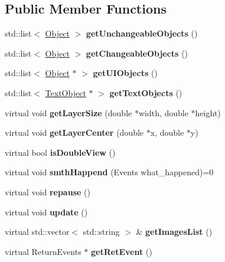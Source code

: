 \subsection*{Public Member Functions}
\begin{DoxyCompactItemize}
\item 
\mbox{\label{class_layer_a88251ea7cc836a16dbca1e134c5a5ee5}} 
std\+::list$<$ \hyperlink{class_object}{Object} $>$ {\bfseries get\+Unchangeable\+Objects} ()
\item 
\mbox{\label{class_layer_af1303bfbd28803f32708729f54ca13ec}} 
std\+::list$<$ \hyperlink{class_object}{Object} $>$ {\bfseries get\+Changeable\+Objects} ()
\item 
\mbox{\label{class_layer_a2aebff84a5f25f25d56d3886c8c3a4b1}} 
std\+::list$<$ \hyperlink{class_object}{Object} $\ast$ $>$ {\bfseries get\+U\+I\+Objects} ()
\item 
\mbox{\label{class_layer_abd1a2a8242a5d43b389e896a3d3de800}} 
std\+::list$<$ \hyperlink{class_text_object}{Text\+Object} $\ast$ $>$ {\bfseries get\+Text\+Objects} ()
\item 
\mbox{\label{class_layer_a62b75693308f561bd8454a32dab9e10f}} 
virtual void {\bfseries get\+Layer\+Size} (double $\ast$width, double $\ast$height)
\item 
\mbox{\label{class_layer_af2778374314bfe517007c0b0ac3fc896}} 
virtual void {\bfseries get\+Layer\+Center} (double $\ast$x, double $\ast$y)
\item 
\mbox{\label{class_layer_a952ad194d28fe6999b85bd3d9d28ee31}} 
virtual bool {\bfseries is\+Double\+View} ()
\item 
\mbox{\label{class_layer_a41318993a0f6c7ba3bc6d964f7802c10}} 
virtual void {\bfseries smth\+Happend} (Events what\+\_\+happened)=0
\item 
\mbox{\label{class_layer_a9e197da9a85a455af77c83301ebb4d1d}} 
virtual void {\bfseries repause} ()
\item 
\mbox{\label{class_layer_a4243d1a4b059eb7433cbfe7cdfc2c191}} 
virtual void {\bfseries update} ()
\item 
\mbox{\label{class_layer_a9acbfda611b85762f4a39ece4ea4df33}} 
virtual std\+::vector$<$ std\+::string $>$ \& {\bfseries get\+Images\+List} ()
\item 
\mbox{\label{class_layer_ac57343394c8dba2a180a7762cd3a20b6}} 
virtual Return\+Events $\ast$ {\bfseries get\+Ret\+Event} ()
\end{DoxyCompactItemize}

